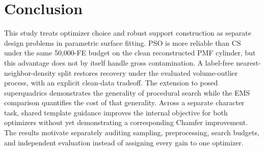 \documentclass[conference]{IEEEtran}
\begin{document}
\section{Conclusion}
This study treats optimizer choice and robust support construction as separate
design problems in parametric surface fitting.  PSO is more reliable than CS
under the same 50,000-FE budget on the clean reconstructed PMF cylinder, but
this advantage does not by itself handle gross contamination.  A label-free
nearest-neighbor-density split
restores recovery under the evaluated volume-outlier process, with an explicit
clean-data tradeoff.  The extension to posed superquadrics demonstrates the
generality of procedural search while the EMS comparison quantifies the cost of
that generality.  Across a separate character task, shared template guidance
improves the internal objective for both optimizers without yet demonstrating a
corresponding Chamfer improvement.  The results motivate separately auditing sampling,
preprocessing, search budgets, and independent evaluation instead of assigning
every gain to one optimizer.

\FloatBarrier


\end{document}
